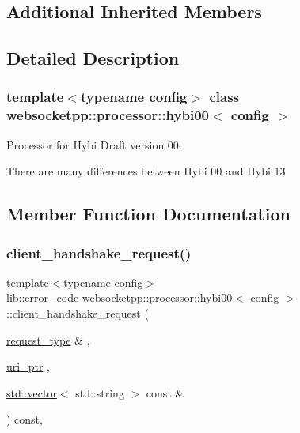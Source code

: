 \subsection*{Additional Inherited Members}


\subsection{Detailed Description}
\subsubsection*{template$<$typename config$>$\newline
class websocketpp\+::processor\+::hybi00$<$ config $>$}

Processor for Hybi Draft version 00. 

There are many differences between Hybi 00 and Hybi 13 

\subsection{Member Function Documentation}
\mbox{\label{classwebsocketpp_1_1processor_1_1hybi00_a5f88e94fc52da9be8ba718889b5c093f}} 
\subsubsection{\texorpdfstring{client\+\_\+handshake\+\_\+request()}{client\_handshake\_request()}}
{\footnotesize\ttfamily template$<$typename config$>$ \\
lib\+::error\+\_\+code \mbox{\hyperlink{classwebsocketpp_1_1processor_1_1hybi00}{websocketpp\+::processor\+::hybi00}}$<$ \mbox{\hyperlink{classconfig}{config}} $>$\+::client\+\_\+handshake\+\_\+request (\begin{DoxyParamCaption}\item[{\mbox{\hyperlink{classwebsocketpp_1_1http_1_1parser_1_1request}{request\+\_\+type}} \&}]{,  }\item[{\mbox{\hyperlink{namespacewebsocketpp_aae370ea5ac83a8ece7712cb39fc23f5b}{uri\+\_\+ptr}}}]{,  }\item[{\mbox{\hyperlink{classstd_1_1vector}{std\+::vector}}$<$ std\+::string $>$ const \&}]{ }\end{DoxyParamCaption}) const\hspace{0.3cm}{\ttfamily [inline]}, {\ttfamily [virtual]}}




